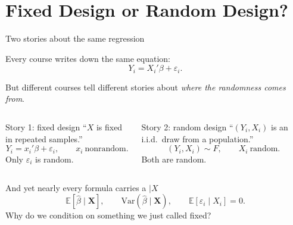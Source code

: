 \documentclass[aspectratio=169,11pt]{beamer}
\newcommand{\E}{\mathbb{E}}
\begin{document}
\section{Fixed Design or Random Design?}

\begin{frame}{Two stories about the same regression}

Every course writes down the same equation:
\[
Y_i = X_i'\beta+\varepsilon_i.
\]

But different courses tell different stories about \emph{where the randomness comes from}.

\vspace{0.3em}

\begin{columns}[T]

\begin{block}{Story 1: fixed design}
``$X$ is fixed in repeated samples.''
\[
Y_i=x_i'\beta+\varepsilon_i,
\qquad
x_i\ \text{nonrandom}.
\]
Only $\varepsilon_i$ is random.
\end{block}

\begin{block}{Story 2: random design}
``$(Y_i,X_i)$ is an i.i.d.\ draw from a population.''
\[
(Y_i,X_i)\sim F,
\qquad
X_i\ \text{random}.
\]
Both are random.
\end{block}

\end{columns}

\vspace{0.3em}

\begin{alertblock}{And yet nearly every formula carries a $\mid X$}
\[
\E[\hat\beta\mid \bm X],
\qquad
\mathrm{Var}(\hat\beta\mid \bm X),
\qquad
\E[\varepsilon_i\mid X_i]=0.
\]
Why do we condition on something we just called fixed?
\end{alertblock}

\end{frame}
\end{document}
